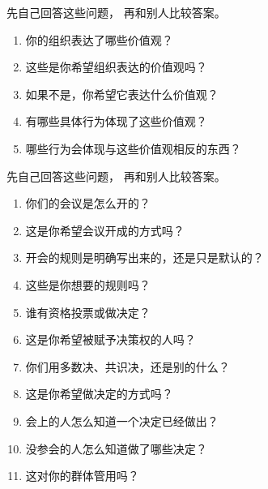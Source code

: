 
先自己回答这些问题，
再和别人比较答案。

\begin{enumerate}

\item
  你的组织表达了哪些价值观？

\item
  这些是你希望组织表达的价值观吗？

\item
  如果不是，你希望它表达什么价值观？

\item
  有哪些具体行为体现了这些价值观？

\item
  哪些行为会体现与这些价值观相反的东西？
\end{enumerate}


先自己回答这些问题，
再和别人比较答案。

\begin{enumerate}

\item
  你们的会议是怎么开的？

\item
  这是你希望会议开成的方式吗？

\item
  开会的规则是明确写出来的，还是只是默认的？

\item
  这些是你想要的规则吗？

\item
  谁有资格投票或做决定？

\item
  这是你希望被赋予决策权的人吗？

\item
  你们用多数决、共识决，还是别的什么？

\item
  这是你希望做决定的方式吗？

\item
  会上的人怎么知道一个决定已经做出？

\item
  没参会的人怎么知道做了哪些决定？

\item
  这对你的群体管用吗？

\end{enumerate}


